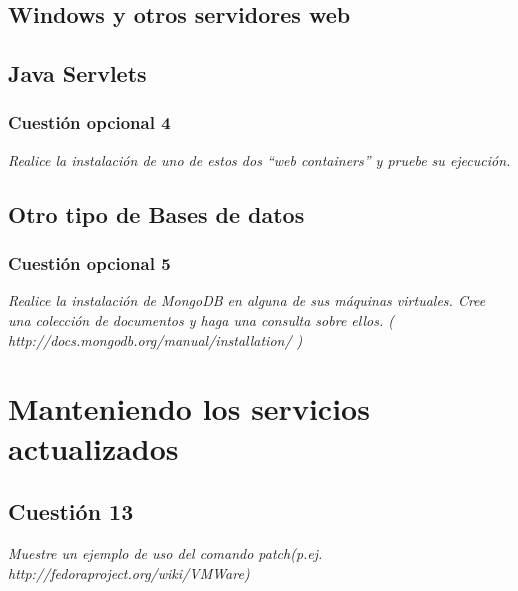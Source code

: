 \subsection{Windows y otros servidores web}





\subsection{Java Servlets}
\subsubsection{Cuestión opcional 4}
\textit{Realice la instalación de uno de estos dos “web containers” y pruebe su ejecución.}







\subsection{Otro tipo de Bases de datos}
\subsubsection{Cuestión opcional 5}
\textit{Realice la instalación de MongoDB en alguna de sus máquinas virtuales. Cree una colección de documentos y haga una consulta sobre ellos. ( http://docs.mongodb.org/manual/installation/ )}







\section{Manteniendo los servicios actualizados}
\subsection{Cuestión 13}
\textit{Muestre un ejemplo de uso del comando patch(p.ej. http://fedoraproject.org/wiki/VMWare)}
\newline








